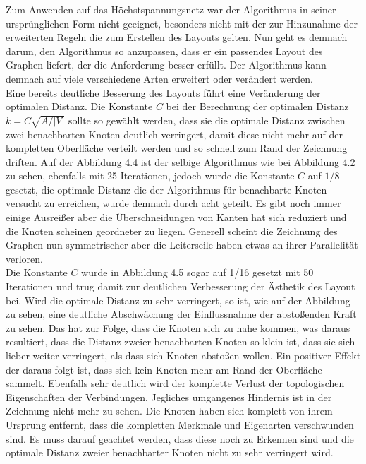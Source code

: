 Zum Anwenden auf das Höchstspannungsnetz war der Algorithmus in seiner ursprünglichen Form nicht geeignet, besonders nicht mit der zur Hinzunahme der erweiterten Regeln die zum Erstellen des Layouts gelten. Nun geht es demnach darum, den Algorithmus so anzupassen, dass er ein passendes Layout des Graphen liefert, der die Anforderung besser erfüllt. Der Algorithmus kann demnach auf viele verschiedene Arten erweitert oder verändert werden. \\

Eine bereits deutliche Besserung des Layouts führt eine Veränderung der optimalen Distanz. Die Konstante $C$ bei der Berechnung der optimalen Distanz	$k = C\sqrt{A / |V|}$ sollte so gewählt werden, dass sie die optimale Distanz zwischen zwei benachbarten Knoten deutlich verringert, damit diese nicht mehr auf der kompletten Oberfläche verteilt werden und so schnell zum Rand der Zeichnung driften. Auf der Abbildung 4.4 ist der selbige Algorithmus wie bei Abbildung 4.2 zu sehen, ebenfalls mit 25 Iterationen, jedoch wurde die Konstante $C$ auf $1/8$ gesetzt, die optimale Distanz die der Algorithmus für benachbarte Knoten versucht zu erreichen, wurde demnach durch acht geteilt. Es gibt noch immer einige Ausreißer aber die Überschneidungen von Kanten hat sich reduziert und die Knoten scheinen geordneter zu liegen. Generell scheint die Zeichnung des Graphen nun symmetrischer aber die Leiterseile haben etwas an ihrer Parallelität verloren.\\


Die Konstante $C$ wurde in Abbildung 4.5 sogar auf 1/16 gesetzt mit 50 Iterationen und trug damit zur deutlichen Verbesserung der Ästhetik des Layout bei. Wird die optimale Distanz zu sehr verringert, so ist, wie auf der Abbildung zu sehen, eine deutliche Abschwächung der Einflussnahme der abstoßenden Kraft zu sehen. Das hat zur Folge, dass die Knoten sich zu nahe kommen, was daraus resultiert, dass die Distanz zweier benachbarten Knoten so klein ist, dass sie sich lieber weiter verringert, als dass sich Knoten abstoßen wollen. Ein positiver Effekt der daraus folgt ist, dass sich kein Knoten mehr am Rand der Oberfläche sammelt. Ebenfalls sehr deutlich wird der komplette Verlust der topologischen Eigenschaften der Verbindungen. Jegliches umgangenes Hindernis ist in der Zeichnung nicht mehr zu sehen. Die Knoten haben sich komplett von ihrem Ursprung entfernt, dass die kompletten Merkmale und Eigenarten verschwunden sind. Es muss darauf geachtet werden, dass diese noch zu Erkennen sind und die optimale Distanz zweier benachbarter Knoten nicht zu sehr verringert wird. \\

